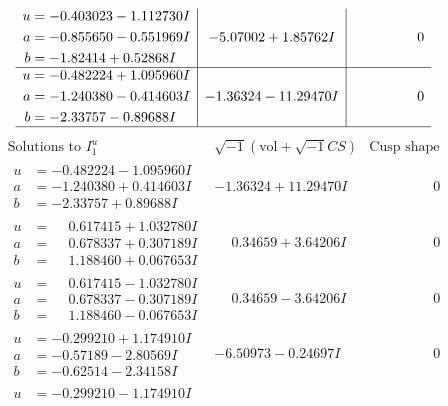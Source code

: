 \documentclass[1p]{elsarticle_modified}
\theoremstyle{definition}
\newcommand{\I}{\sqrt{-1}}
\begin{document}
$$\begin{array}{c|c|c}
\begin{aligned}
u &= -0.403023 - 1.112730 I \\
a &= -0.855650 - 0.551969 I \\
b &= -1.82414 + 0.52868 I\end{aligned}
 & -5.07002 + 1.85762 I & \phantom{-0.000000 } 0 \\ \hline\begin{aligned}
u &= -0.482224 + 1.095960 I \\
a &= -1.240380 - 0.414603 I \\
b &= -2.33757 - 0.89688 I\end{aligned}
 & -1.36324 - 11.29470 I & \phantom{-0.000000 } 0\\
 \hline 
 \end{array}$$\newpage$$\begin{array}{c|c|c}  
\text{Solutions to }I^u_{1}& \I (\text{vol} + \sqrt{-1}CS) & \text{Cusp shape}\\
 \hline 
\begin{aligned}
u &= -0.482224 - 1.095960 I \\
a &= -1.240380 + 0.414603 I \\
b &= -2.33757 + 0.89688 I\end{aligned}
 & -1.36324 + 11.29470 I & \phantom{-0.000000 } 0 \\ \hline\begin{aligned}
u &= \phantom{-}0.617415 + 1.032780 I \\
a &= \phantom{-}0.678337 + 0.307189 I \\
b &= \phantom{-}1.188460 + 0.067653 I\end{aligned}
 & \phantom{-}0.34659 + 3.64206 I & \phantom{-0.000000 } 0 \\ \hline\begin{aligned}
u &= \phantom{-}0.617415 - 1.032780 I \\
a &= \phantom{-}0.678337 - 0.307189 I \\
b &= \phantom{-}1.188460 - 0.067653 I\end{aligned}
 & \phantom{-}0.34659 - 3.64206 I & \phantom{-0.000000 } 0 \\ \hline\begin{aligned}
u &= -0.299210 + 1.174910 I \\
a &= -0.57189 - 2.80569 I \\
b &= -0.62514 - 2.34158 I\end{aligned}
 & -6.50973 - 0.24697 I & \phantom{-0.000000 } 0 \\ \hline\begin{aligned}
u &= -0.299210 - 1.174910 I \\

\end{aligned}
\end{array}$$
\end{document}

